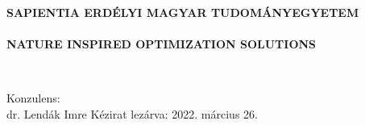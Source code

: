 \newpage
{}
\linespread{1}

\begin{center}
    {\bfseries
    \vspace*{1.5cm}
    \large{SAPIENTIA ERDÉLYI MAGYAR TUDOMÁNYEGYETEM} \\\vspace{2.5cm}
    \large{\@title} \\ \vspace{1.5cm}
    \large{NATURE INSPIRED OPTIMIZATION SOLUTIONS} \\ \vspace{2cm}
    }
    \large{
    \@author \\ \vspace{2cm}
    
    Konzulens: \\
    dr. Lendák Imre
    \vfill
    Kézirat lezárva: 2022. március 26.
    }
\end{center}
